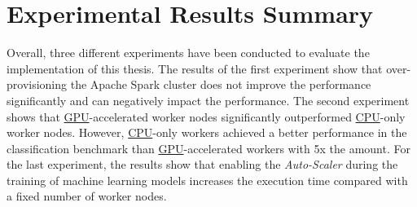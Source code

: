 \section{Experimental Results Summary}
Overall, three different experiments have been conducted to evaluate the implementation of this thesis.
The results of the first experiment show that over-provisioning the Apache Spark cluster does not improve the performance significantly and can negatively impact the performance. 
The second experiment shows that \hyperlink{abbr:gpu}{GPU}-accelerated worker nodes significantly outperformed \hyperlink{abbr:cpu}{CPU}-only worker nodes. However, \hyperlink{abbr:cpu}{CPU}-only workers achieved a better performance in the classification benchmark than \hyperlink{abbr:gpu}{GPU}-accelerated workers with 5x the amount.
For the last experiment, the results show that enabling the \textit{Auto-Scaler} during the training of machine learning models increases the execution time compared with a fixed number of worker nodes.

